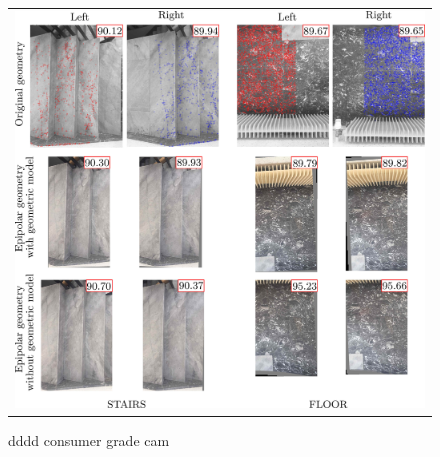 \documentclass{ipol}
\begin{document}


\begin{figure}[h!]
\centering
\begin{tabular}{c}
\includegraphics[width=14cm]{FIGS/escalier_sol.jpeg}
\end{tabular}
\caption{dddd consumer grade cam}
 
\label{ExpConsumerCam}
\end{figure}

 




\end{document}

